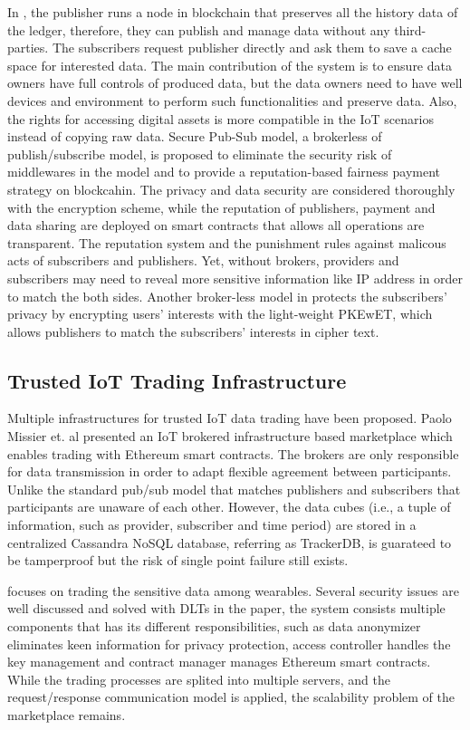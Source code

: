 \documentclass[conference]{IEEEtran}
\begin{document}
In \cite{userCentricData}, the publisher runs a node in blockchain that preserves all the history data of the ledger, therefore, they can publish and manage data without any third-parties. The subscribers request publisher directly and ask them to save a cache space for interested data. The main contribution of the system is to ensure data owners have full controls of produced data, but the data owners need to have well devices and environment to perform such functionalities and preserve data. Also, the rights for accessing digital assets is more compatible in the IoT scenarios instead of copying raw data. Secure Pub-Sub model\cite{SPS}, a brokerless of publish/subscribe model, is proposed to eliminate the security risk of middlewares in the model and to provide a reputation-based fairness payment strategy on blockcahin. The privacy and data security are considered thoroughly with the encryption scheme, while the reputation of publishers, payment and data sharing are deployed on smart contracts that allows all operations are transparent. The reputation system and the punishment rules against malicous acts of subscribers and publishers. Yet, without brokers, providers and subscribers may need to reveal more sensitive information like IP address in order to match the both sides. Another broker-less model in \cite{PrivacyPreservPubSub} protects the subscribers' privacy by encrypting users' interests with the light-weight PKEwET\cite{PKEwET}, which allows publishers to match the subscribers' interests in cipher text. 

\subsection{Trusted IoT Trading Infrastructure}
Multiple infrastructures for trusted IoT data trading have been proposed. Paolo Missier et. al\cite{MindMyValue} presented an IoT brokered infrastructure based marketplace which enables trading with Ethereum smart contracts. The brokers are only responsible for data transmission in order to adapt flexible agreement between participants. Unlike the standard pub/sub model that matches publishers and subscribers that participants are unaware of each other. However, the data cubes (i.e., a tuple of information, such as provider, subscriber and time period) are stored in a centralized Cassandra NoSQL database, referring as TrackerDB, is guarateed to be tamperproof but the risk of single point failure still exists. 

\cite{TrustedMarketplaceWearable} focuses on trading the sensitive data among wearables. Several security issues are well discussed and solved with DLTs in the paper, the system consists multiple components that has its different responsibilities, such as data anonymizer eliminates keen information for privacy protection, access controller handles the key management and contract manager manages Ethereum smart contracts. While the trading processes are splited into multiple servers, and the request/response communication model is applied, the scalability problem of the marketplace remains.
\end{document}
